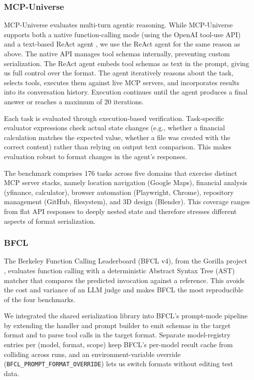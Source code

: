 \documentclass[11pt]{article}
\begin{document}
\subsubsection{MCP-Universe}
MCP-Universe \citep{luo2025mcpuniverse} evaluates multi-turn agentic reasoning. While MCP-Universe supports both a native function-calling mode (using the OpenAI tool-use API) and a text-based ReAct agent \citep{yao2023react}, we use the ReAct agent for the same reason as above. The native API manages tool schemas internally, preventing custom serialization. The ReAct agent embeds tool schemas as text in the prompt, giving us full control over the format. The agent iteratively reasons about the task, selects tools, executes them against live MCP servers, and incorporates results into its conversation history. Execution continues until the agent produces a final answer or reaches a maximum of 20 iterations.

Each task is evaluated through execution-based verification. Task-specific evaluator expressions check actual state changes (e.g., whether a financial calculation matches the expected value, whether a file was created with the correct content) rather than relying on output text comparison. This makes evaluation robust to format changes in the agent's responses.

The benchmark comprises 176 tasks across five domains that exercise distinct MCP server stacks, namely location navigation (Google Maps), financial analysis (yfinance, calculator), browser automation (Playwright, Chrome), repository management (GitHub, filesystem), and 3D design (Blender). This coverage ranges from flat API responses to deeply nested state and therefore stresses different aspects of format serialization.

\subsubsection{BFCL}
The Berkeley Function Calling Leaderboard (BFCL v4), from the Gorilla project \citep{patil2023gorilla}, evaluates function calling with a deterministic Abstract Syntax Tree (AST) matcher that compares the predicted invocation against a reference. This avoids the cost and variance of an LLM judge and makes BFCL the most reproducible of the four benchmarks.

We integrated the shared serialization library into BFCL's prompt-mode pipeline by extending the handler and prompt builder to emit schemas in the target format and to parse tool calls in the target format. Separate model-registry entries per (model, format, scope) keep BFCL's per-model result cache from colliding across runs, and an environment-variable override (\texttt{BFCL\_PROMPT\_FORMAT\_OVERRIDE}) lets us switch formats without editing test data.
\end{document}
